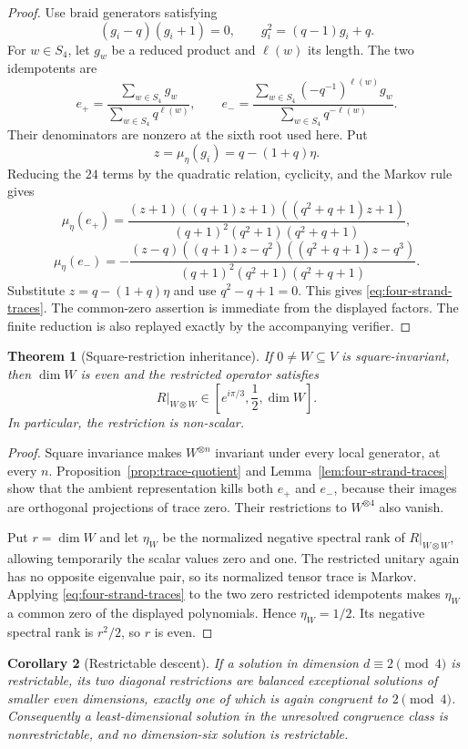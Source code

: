 \documentclass[11pt]{article}
\newtheorem{theorem}{Theorem}[section]
\newtheorem{corollary}[theorem]{Corollary}
\theoremstyle{definition}
\theoremstyle{remark}
\begin{document}
\begin{proof}
Use braid generators satisfying
\[
 (g_i-q)(g_i+1)=0,\qquad
 g_i^2=(q-1)g_i+q.
\]
For \(w\in S_4\), let \(g_w\) be a reduced product and
\(\ell(w)\) its length. The two idempotents are
\[
 e_+
 =\frac{\sum_{w\in S_4}g_w}
        {\sum_{w\in S_4}q^{\ell(w)}},
\qquad
 e_-
 =\frac{\sum_{w\in S_4}(-q^{-1})^{\ell(w)}g_w}
        {\sum_{w\in S_4}q^{-\ell(w)}}.
\]
Their denominators are nonzero at the sixth root used here. Put
\[
 z=\mu_\eta(g_i)=q-(1+q)\eta.
\]
Reducing the \(24\) terms by the quadratic relation, cyclicity, and the
Markov rule gives
\[
 \mu_\eta(e_+)
 =
 \frac{(z+1)((q+1)z+1)((q^2+q+1)z+1)}
 {(q+1)^2(q^2+1)(q^2+q+1)},
\]
\[
 \mu_\eta(e_-)
 =
 -\frac{(z-q)((q+1)z-q^2)
 ((q^2+q+1)z-q^3)}
 {(q+1)^2(q^2+1)(q^2+q+1)}.
\]
Substitute \(z=q-(1+q)\eta\) and use \(q^2-q+1=0\). This gives
\eqref{eq:four-strand-traces}. The common-zero assertion is immediate
from the displayed factors. The finite reduction is also replayed exactly
by the accompanying verifier.
\end{proof}

\begin{theorem}[Square-restriction inheritance]
\label{thm:square-inheritance}
If \(0\ne W\subseteq V\) is square-invariant, then \(\dim W\) is even and
the restricted operator satisfies
\[
  R|_{W\otimes W}\in
  \left[e^{i\pi/3},\frac12,\dim W\right].
\]
In particular, the restriction is non-scalar.
\end{theorem}

\begin{proof}
Square invariance makes \(W^{\otimes n}\) invariant under every local
generator, at every \(n\). Proposition~\ref{prop:trace-quotient} and
Lemma~\ref{lem:four-strand-traces} show that the ambient representation
kills both \(e_+\) and \(e_-\), because their images are orthogonal
projections of trace zero. Their restrictions to \(W^{\otimes4}\) also
vanish.

Put \(r=\dim W\) and let \(\eta_W\) be the normalized negative spectral
rank of \(R|_{W\otimes W}\), allowing temporarily the scalar values zero
and one. The restricted unitary again has no opposite eigenvalue pair, so
its normalized tensor trace is Markov. Applying
\eqref{eq:four-strand-traces} to the two zero restricted idempotents makes
\(\eta_W\) a common zero of the displayed polynomials. Hence
\(\eta_W=1/2\). Its negative spectral rank is \(r^2/2\), so \(r\) is even.
\end{proof}

\begin{corollary}[Restrictable descent]\label{cor:restrictable}
If a solution in dimension \(d\equiv2\pmod4\) is restrictable, its two
diagonal restrictions are balanced exceptional solutions of smaller even
dimensions, exactly one of which is again congruent to \(2\pmod4\).
Consequently a least-dimensional solution in the unresolved congruence
class is nonrestrictable, and no dimension-six solution is restrictable.
\end{corollary}
\end{document}
